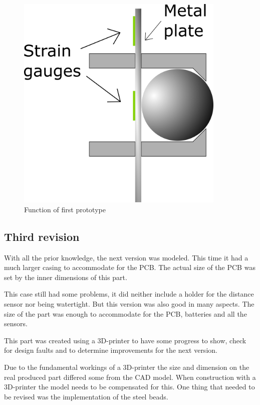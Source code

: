 \begin{figure}[H]
\begin{center}
	\includegraphics[width = 10cm]{Figures/Press_sens_func_1.png}
	\caption{Function of first prototype}
	\label{Press_sens_prot_1}
\end{center}
\end{figure}

\subsection{Third revision}
With all the prior knowledge, the next version was modeled. This time it had a much larger casing to accommodate for the PCB. The actual size of the PCB was set by the inner dimensions of this part.  

This case still had some problems, it did neither include a holder for the distance sensor nor being watertight. But this version was also good in many aspects. The size of the part was enough to accommodate for the PCB, batteries and all the sensors.  

This part was created using a 3D-printer to have some progress to show, check for design faults and to determine improvements for the next version.  

Due to the fundamental workings of a 3D-printer the size and dimension on the real produced part differed some from the CAD model. When construction with a 3D-printer the model needs to be compensated for this. One thing that needed to be revised was the implementation of the steel beads.  

